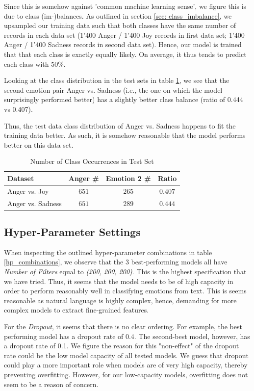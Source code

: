 \documentclass[fleqn,10pt]{SelfArx} %
\begin{document}
{Since this is somehow against 'common machine learning sense', we figure this is due to class (im-)balances. As outlined in section \ref{sec: class_imbalance}, we upsampled our training data such that both classes have the same number of records in each data set (1'400 Anger / 1'400 Joy records in first data set; 1'400 Anger / 1'400 Sadness records in second data set). Hence, our model is trained that that each class is exactly equally likely. On average, it thus tends to predict each class with 50\%.

Looking at the class distribution in the test sets in table \ref{tab:classes_testset}, we see that the second emotion pair Anger vs. Sadness (i.e., the one on which the model surprisingly performed better) has a slightly better class balance (ratio of 0.444 vs 0.407).

Thus, the test data class distribution of Anger vs. Sadness happens to fit the training data better. As such, it is somehow reasonable that the model performs better on this data set.

\begin{table}[hbt]
	\centering
	\begin{tabular}{lccc}
		\toprule
		Dataset & Anger \# & Emotion 2 \# & Ratio \\
		\midrule
		  Anger vs. Joy & $651$ & $265$ & $0.407$ & \\
		  Anger vs. Sadness & $651$ & $289$ & $0.444$ & \\
		\bottomrule
	\end{tabular}
	\caption{Number of Class Occurrences in Test Set}
	\label{tab:classes_testset}
\end{table}

\subsection{Hyper-Parameter Settings}
When inspecting the outlined hyper-parameter combinations in table \ref{hp_combinations}, we observe that the 3 best-performing models all have \textit{Number of Filters} equal to \textit{(200, 200, 200)}. This is the highest specification that we have tried. Thus, it seems that the model needs to be of high capacity in order to perform reasonably well in classifying emotions from text. This is seems reasonable as natural language is highly complex, hence, demanding for more complex models to extract fine-grained features.

For the \textit{Dropout}, it seems that there is no clear ordering. For example, the best performing model has a dropout rate of 0.4. The second-best model, however, has a dropout rate of 0.1. We figure the reason for this "non-effect" of the dropout rate could be the low model capacity of all tested models. We guess that dropout could play a more important role when models are of very high capacity, thereby preventing overfitting. However, for our low-capacity models, overfitting does not seem to be a reason of concern.

}
\end{document}
